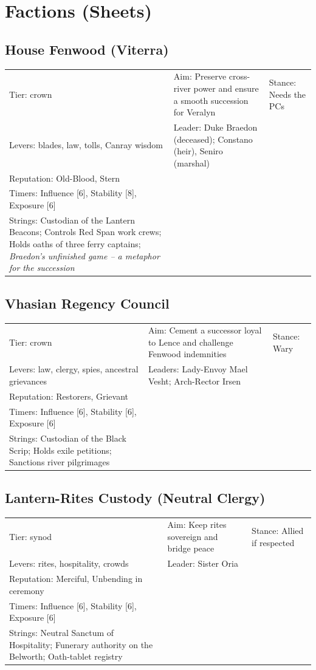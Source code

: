 \documentclass[11pt]{article}
\begin{document}
\section*{Factions (Sheets)}

\subsection*{House Fenwood (Viterra)}
\begin{longtable}{@{}lll@{}}
Tier: crown & Aim: Preserve cross-river power and ensure a smooth succession for Veralyn & Stance: Needs the PCs \\
Levers: blades, law, tolls, Canray wisdom & Leader: Duke Braedon (deceased); Constano (heir), Seniro (marshal) & \\
Reputation: Old-Blood, Stern & & \\
Timers: Influence [6], Stability [8], Exposure [6] & & \\
Strings: Custodian of the Lantern Beacons; Controls Red Span work crews; Holds oaths of three ferry captains; \textit{Braedon's unfinished game -- a metaphor for the succession} & & \\
\end{longtable}

\subsection*{Vhasian Regency Council}
\begin{longtable}{@{}lll@{}}
Tier: crown & Aim: Cement a successor loyal to Lence and challenge Fenwood indemnities & Stance: Wary \\
Levers: law, clergy, spies, ancestral grievances & Leaders: Lady-Envoy Mael Vesht; Arch-Rector Irsen & \\
Reputation: Restorers, Grievant & & \\
Timers: Influence [6], Stability [6], Exposure [6] & & \\
Strings: Custodian of the Black Scrip; Holds exile petitions; Sanctions river pilgrimages & & \\
\end{longtable}

\subsection*{Lantern-Rites Custody (Neutral Clergy)}
\begin{longtable}{@{}lll@{}}
Tier: synod & Aim: Keep rites sovereign and bridge peace & Stance: Allied if respected \\
Levers: rites, hospitality, crowds & Leader: Sister Oria & \\
Reputation: Merciful, Unbending in ceremony & & \\
Timers: Influence [6], Stability [6], Exposure [6] & & \\
Strings: Neutral Sanctum of Hospitality; Funerary authority on the Belworth; Oath-tablet registry & & \\
\end{longtable}
\end{document}
